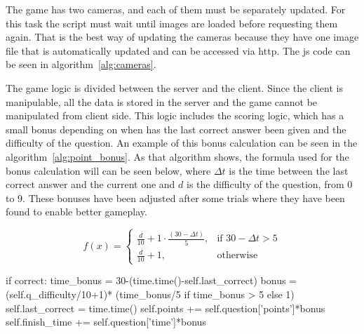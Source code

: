 The game has two cameras, and each of them must be separately updated. For this task the script must
wait until images are loaded before requesting them again. That is the best way of updating the
cameras because they have one image file that is automatically updated and can be accessed via
\acrshort{http}. The \acrlong{js} code can be seen in algorithm~\ref{alg:cameras}.

\begin{center}
\begin{minipage}{.9\textwidth}
\singlespace
{}
\end{minipage}
\end{center}

The game logic is divided between the server and the client. Since the client is manipulable, all
the data is stored in the server and the game cannot be manipulated from client side. This logic
includes the scoring logic, which has a small bonus depending on when has the last correct answer
been given and the difficulty of the question. An example of this bonus calculation can be seen in
the algorithm~\ref{alg:point_bonus}. As that algorithm shows, the formula used for the bonus
calculation will can be seen below, where $\Delta{t}$ is the time between the last correct answer
and the current one and $d$ is the difficulty of the question, from 0 to 9. These bonuses have been
adjusted after some trials where they have been found to enable better gameplay.

\[
    f(x)=
\begin{cases}
    \frac{d}{10}+1\cdot\frac{(30-\Delta{t})}{5},	& \text{if } 30-\Delta{t} > 5\\
    \frac{d}{10}+1,									& \text{otherwise}
\end{cases}
\]

\begin{center}
\begin{minipage}{.9\textwidth}
\singlespace
{}
\begin{pyglist}[language=python, caption={Point bonus calculation.},
	label={alg:point_bonus}, listingname={Algorithm}, numbers=left]
if correct:
    time_bonus = 30-(time.time()-self.last_correct)
    bonus = (self.q_difficulty/10+1)*
        (time_bonus/5 if time_bonus > 5 else 1)
    self.last_correct = time.time()
    self.points += self.question['points']*bonus
    self.finish_time += self.question['time']*bonus
\end{pyglist}
\end{minipage}
\end{center}

